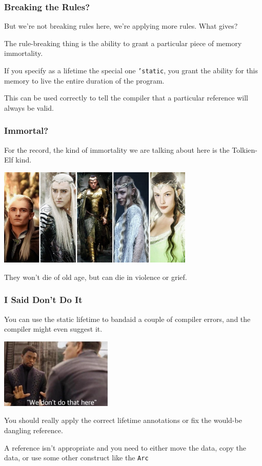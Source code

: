 \begin{frame}
\frametitle{Breaking the Rules?}
But we're not breaking rules here, we're applying more rules. What gives? 

The rule-breaking thing is the ability to grant a particular piece of memory immortality. 

If you specify as a lifetime the special one \texttt{'static}, you grant the ability for this memory to live the entire duration of the program.

This can be used correctly to tell the compiler that a particular reference will always be valid.

\end{frame}


\begin{frame}
\frametitle{Immortal?}

For the record, the kind of immortality we are talking about here is the Tolkien-Elf kind.

\begin{center}
	\includegraphics[width=0.7\textwidth]{images/tolkien-elves.jpg}
\end{center}

They won't die of old age, but can die in violence or grief.

\end{frame}


\begin{frame}
\frametitle{I Said Don't Do It}

You can use the static lifetime to bandaid a couple of compiler errors, and the compiler might even suggest it. 

\begin{center}
	\includegraphics[width=0.4\textwidth]{images/blackpanther.jpg}
\end{center}


You should really apply the correct lifetime annotations or fix the would-be dangling reference.


A reference isn't appropriate and you need to either move the data, copy the data, or use some other construct like the \texttt{Arc} 
\end{frame}



